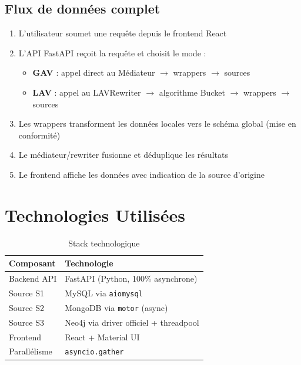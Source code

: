 \documentclass[12pt,a4paper]{article}
\begin{document}
\subsection{Flux de données complet}

\begin{enumerate}
  \item L'utilisateur soumet une requête depuis le frontend React
  \item L'API FastAPI reçoit la requête et choisit le mode :
    \begin{itemize}
      \item \textbf{GAV} : appel direct au Médiateur $\rightarrow$ wrappers $\rightarrow$ sources
      \item \textbf{LAV} : appel au LAVRewriter $\rightarrow$ algorithme Bucket $\rightarrow$ wrappers $\rightarrow$ sources
    \end{itemize}
  \item Les wrappers transforment les données locales vers le schéma global (mise en conformité)
  \item Le médiateur/rewriter fusionne et déduplique les résultats
  \item Le frontend affiche les données avec indication de la source d'origine
\end{enumerate}

\section{Technologies Utilisées}

\begin{table}[H]
\centering
\begin{tabular}{ll}
\toprule
\textbf{Composant} & \textbf{Technologie} \\
\midrule
Backend API & FastAPI (Python, 100\% asynchrone) \\
Source S1 & MySQL via \texttt{aiomysql} \\
Source S2 & MongoDB via \texttt{motor} (async) \\
Source S3 & Neo4j via driver officiel + threadpool \\
Frontend & React + Material UI \\
Parallélisme & \texttt{asyncio.gather} \\
\bottomrule
\end{tabular}
\caption{Stack technologique}
\end{table}
\end{document}
